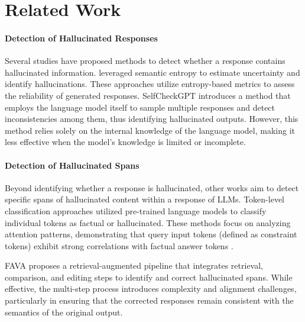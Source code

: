 \section{Related Work}
\paragraph{Detection of Hallucinated Responses} Several studies have proposed methods to detect whether a response contains hallucinated information. \citet{Farquhar2024Detecting, han2024semantic, arteaga2024hallucination} leveraged semantic entropy \cite{kuhn2023semantic} to estimate uncertainty and identify hallucinations. These approaches utilize entropy-based metrics to assess the reliability of generated responses.
SelfCheckGPT \cite{manakul-etal-2023-selfcheckgpt} introduces a method that employs the language model itself to sample multiple responses and detect inconsistencies among them, thus identifying hallucinated outputs. However, this method relies solely on the internal knowledge of the language model, making it less effective when the model's knowledge is limited or incomplete.

\paragraph{Detection of Hallucinated Spans} Beyond identifying whether a response is hallucinated, other works aim to detect specific spans of hallucinated content within a response of LLMs. Token-level classification approaches \cite{liu-etal-2022-token} utilized pre-trained language models to classify individual tokens as factual or hallucinated. These methods focus on analyzing attention patterns, demonstrating that query input tokens (defined as constraint tokens) exhibit strong correlations with factual answer tokens \cite{yuksekgonul2024attention}.

FAVA \cite{mishra2024finegrained-FAVA} proposes a retrieval-augmented pipeline that integrates retrieval, comparison, and editing steps to identify and correct hallucinated spans. While effective, the multi-step process introduces complexity and alignment challenges, particularly in ensuring that the corrected responses remain consistent with the semantics of the original output.

